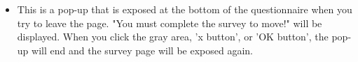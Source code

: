 \documentclass[conference]{IEEEtran}
\begin{document}
\begin{enumerate}
\begin{enumerate}
\begin{itemize}
        \item[]  This is a pop-up that is exposed at the bottom of the questionnaire when you try to leave the page. "You must complete the survey to move!" will be displayed. When you click the gray area, 'x button', or 'OK button', the pop-up will end and the survey page will be exposed again.\\ \\ \\ \\ \\ \\ \\ \\ \\ \\ \\ \\ \\ \\ \\ \\ \\ \\ \\ \\ \\ 
        \end{itemize} 
\break        


\end{enumerate}
\end{enumerate}
\end{document}
